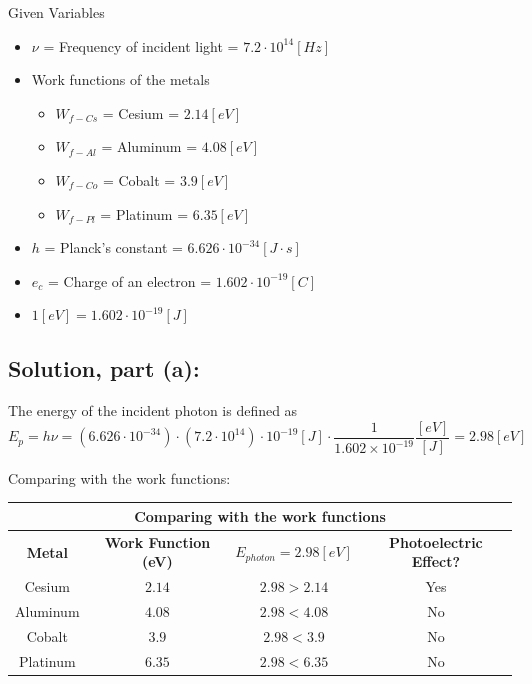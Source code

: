 \documentclass[12pt]{article}
\begin{document}
    Given Variables
        \begin{itemize}
            \item $\nu$ = Frequency of incident light = $7.2 \cdot 10^{14} [Hz]$
            \item Work functions of the metals
            \begin{itemize}
                \item $W_{f-Cs}$ = Cesium = $2.14 [eV]$
                \item $W_{f-Al}$ = Aluminum = $4.08 [eV]$
                \item $W_{f-Co}$ = Cobalt = $3.9 [eV]$
                \item $W_{f-Pl}$ = Platinum = $6.35 [eV]$
            \end{itemize}
            \item $h$ = Planck’s constant = $6.626 \cdot 10^{-34} [J \cdot s]$
            \item $e_c$ = Charge of an electron = $1.602 \cdot 10^{-19} [C]$
            \item $1 [eV] = 1.602 \cdot 10^{-19} [J]$
    \end{itemize}
    
    \subsection*{Solution, part (a):}
        The energy of the incident photon is defined as
        \begin{equation}
            E_{p} = h \nu = (6.626 \cdot 10^{-34}) \cdot (7.2 \cdot 10^{14}) \cdot 10^{-19} [J] \cdot \frac{1}{1.602 \times 10^{-19}} \frac{[eV]}{[J]} = 2.98 [eV]
        \end{equation}
    
        Comparing with the work functions:
        \begin{center}
            \begin{tabular}{|c|c|c|c|} \hline 
                \multicolumn{4}{|c|}{\textbf{Comparing with the work functions}}\\ \hline 
                \textbf{Metal}      &   \textbf{Work Function (eV)}     &   \textbf{$E_{photon} = 2.98 [eV]$}  &   \textbf{Photoelectric Effect?} \\ \hline 
                Cesium              &   $2.14$                          &   $2.98 > 2.14$                           &   Yes \\ \hline 
                Aluminum            &   $4.08$                          &   $2.98 < 4.08$                           &   No \\ \hline 
                Cobalt              &   $3.9$                           &   $2.98 < 3.9$                            &   No \\ \hline 
                Platinum            &   $6.35$                          &   $2.98 < 6.35$                           &   No \\ \hline
            \end{tabular}
        \end{center}
        
\end{document}
